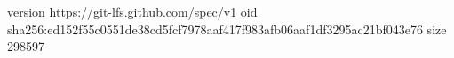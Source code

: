 version https://git-lfs.github.com/spec/v1
oid sha256:ed152f55c0551de38cd5fcf7978aaf417f983afb06aaf1df3295ac21bf043e76
size 298597
